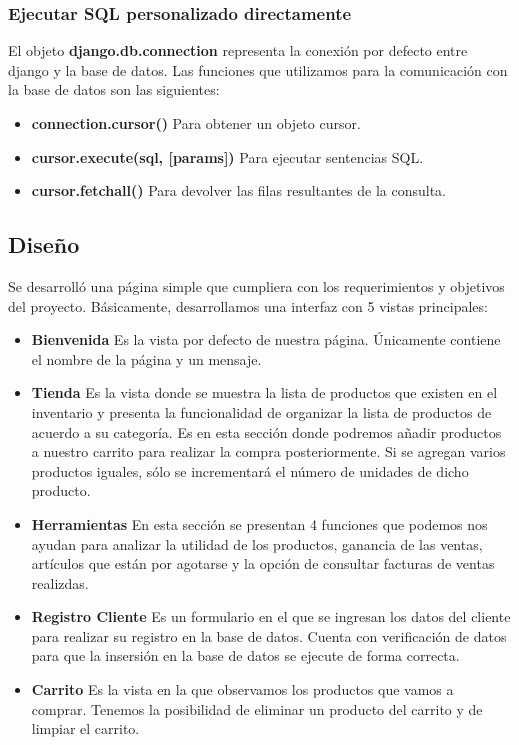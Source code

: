 \documentclass[12pt,letterpaper]{article}
\begin{document}
	\subsubsection{Ejecutar SQL personalizado directamente}
	El objeto \textbf{django.db.connection} representa la conexión por defecto entre django y la base de datos. Las funciones que utilizamos para la comunicación con la base de datos son las siguientes:
	\begin{itemize}
		\item \textbf{connection.cursor()}
		\subitem Para obtener un objeto cursor.
		
		\item \textbf{cursor.execute(sql, [params])}
		\subitem Para ejecutar sentencias SQL.
		
		\item \textbf{cursor.fetchall()}
		\subitem Para devolver las filas resultantes de la consulta.
	\end{itemize}
	
	\subsection{Diseño}
	Se desarrolló una página simple que cumpliera con los requerimientos y objetivos del proyecto. Básicamente, desarrollamos una interfaz con 5 vistas principales: 
	\begin{itemize}
		\item \textbf{Bienvenida} Es la vista por defecto de nuestra página. Únicamente contiene el nombre de la página y un mensaje.
		\item \textbf{Tienda} Es la vista donde se muestra la lista de productos que existen en el inventario y presenta la funcionalidad de organizar la lista de productos de acuerdo a su categoría. Es en esta sección donde podremos añadir productos a nuestro carrito para realizar la compra posteriormente. Si se agregan varios productos iguales, sólo se incrementará el número de unidades de dicho producto.
		\item \textbf{Herramientas} En esta sección se presentan 4 funciones que podemos nos ayudan para analizar la utilidad de los productos, ganancia de las ventas, artículos que están por agotarse y la opción de consultar facturas de ventas realizdas.
		\item \textbf{Registro Cliente} Es un formulario en el que se ingresan los datos del cliente para realizar su registro en la base de datos. Cuenta con verificación de datos para que la insersión en la base de datos se ejecute de forma correcta.
		\item \textbf{Carrito} Es la vista en la que observamos los productos que vamos a comprar. Tenemos la posibilidad de eliminar un producto del carrito y de limpiar el carrito.
	\end{itemize}
	
\end{document}
